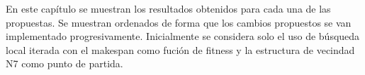 En este capítulo se muestran los resultados obtenidos para cada una de las propuestas. Se muestran ordenados de forma que los cambios propuestos se van implementado progresivamente. Inicialmente se considera solo el uso de búsqueda local iterada con el makespan como fución de fitness y la estructura de vecindad N7 como punto de partida.
